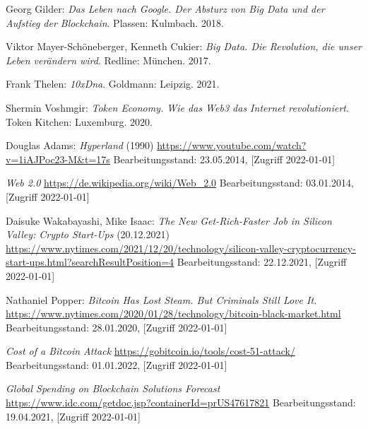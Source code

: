 \newpage

\begin{thebibliography}{9}

    Georg Gilder:
    \textit{Das Leben nach Google. Der Absturz von Big Data und der Aufstieg der Blockchain}. Plassen: Kulmbach. 2018.

    Viktor Mayer-Schöneberger, Kenneth Cukier:
    \textit{Big Data. Die Revolution, die unser Leben verändern wird}. Redline: München. 2017.

    Frank Thelen:
    \textit{10xDna}. Goldmann: Leipzig. 2021.

    Shermin Voshmgir:
    \textit{Token Economy. Wie das Web3 das Internet revolutioniert}. Token Kitchen: Luxemburg. 2020.

    Douglas Adams:
    \textit{Hyperland} (1990)
    \url{https://www.youtube.com/watch?v=1iAJPoc23-M&t=17s}
    Bearbeitungsstand: 23.05.2014,
    [Zugriff 2022-01-01]

    \textit{Web 2.0}
    \url{https://de.wikipedia.org/wiki/Web_2.0}
    Bearbeitungsstand: 03.01.2014,
    [Zugriff 2022-01-01]

    Daisuke Wakabayashi, Mike Isaac:
    \textit{The New Get-Rich-Faster Job in Silicon Valley: Crypto Start-Ups} (20.12.2021)
    \url{https://www.nytimes.com/2021/12/20/technology/silicon-valley-cryptocurrency-start-ups.html?searchResultPosition=4}
    Bearbeitungsstand: 22.12.2021,
    [Zugriff 2022-01-01]

    Nathaniel Popper:
    \textit{Bitcoin Has Lost Steam. But Criminals Still Love It.}
    \url{https://www.nytimes.com/2020/01/28/technology/bitcoin-black-market.html}
    Bearbeitungsstand: 28.01.2020,
    [Zugriff 2022-01-01]

    \textit{Cost of a Bitcoin Attack}
    \url{https://gobitcoin.io/tools/cost-51-attack/}
    Bearbeitungsstand: 01.01.2022,
    [Zugriff 2022-01-01]

    \textit{Global Spending on Blockchain Solutions Forecast}
    \url{https://www.idc.com/getdoc.jsp?containerId=prUS47617821}
    Bearbeitungsstand: 19.04.2021,
    [Zugriff 2022-01-01]





\end{thebibliography}